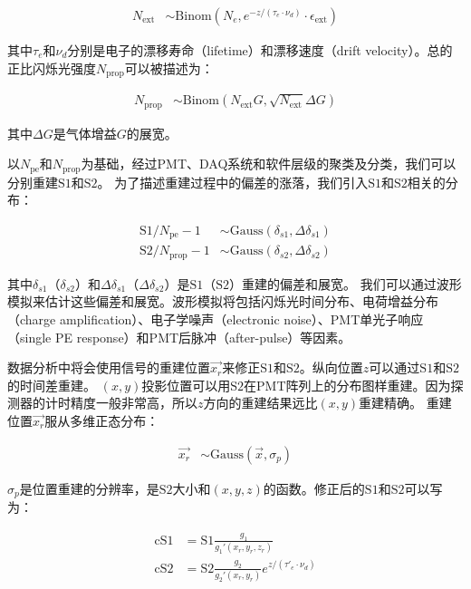 \begin{align}
    \label{eq:N_ext}
    N_{\mathrm{ext}} &\sim \mathrm{Binom}\left(N_e,e^{-z/(\tau_e\cdot\nu_d)}\cdot\epsilon_{\mathrm{ext}}\right)
\end{align}

其中$\tau_e$和$\nu_d$分别是电子的漂移寿命（lifetime）和漂移速度（drift velocity）。总的正比闪烁光强度$N_{\mathrm{prop}}$可以被描述为：

\begin{align}
    \label{eq:N_prop}
    N_{\mathrm{prop}} &\sim \mathrm{Binom}\left(N_{\mathrm{ext}}G,\sqrt{N_{\mathrm{ext}}}\Delta G\right)
\end{align}

其中$\Delta G$是气体增益$G$的展宽。

以$N_{\mathrm{pe}}$和$N_{\mathrm{prop}}$为基础，经过PMT、DAQ系统和软件层级的聚类及分类，我们可以分别重建$\mathrm{S1}$和$\mathrm{S2}$。
为了描述重建过程中的偏差的涨落，我们引入$\mathrm{S1}$和$\mathrm{S2}$相关的分布：

\begin{align}
    \label{eq:s1s2}
    \mathrm{S1}/N_{\mathrm{pe}}-1 &\sim \mathrm{Gauss}\left(\delta_{s1},\Delta \delta_{s1}\right) \\
    \mathrm{S2}/N_{\mathrm{prop}}-1 &\sim \mathrm{Gauss}\left(\delta_{s2},\Delta \delta_{s2}\right)
\end{align}

其中$\delta_{s1}$（$\delta_{s2}$）和$\Delta \delta_{s1}$（$\Delta \delta_{s2}$）是$\mathrm{S1}$（$\mathrm{S2}$）重建的偏差和展宽。
我们可以通过波形模拟来估计这些偏差和展宽。波形模拟将包括闪烁光时间分布、电荷增益分布（charge amplification）、电子学噪声（electronic noise）、PMT单光子响应（single PE response）和PMT后脉冲（after-pulse）等因素。

数据分析中将会使用信号的重建位置$\vec{x_r}$来修正$\mathrm{S1}$和$\mathrm{S2}$。纵向位置$z$可以通过$\mathrm{S1}$和$\mathrm{S2}$的时间差重建。
$(x,y)$投影位置可以用$\mathrm{S2}$在PMT阵列上的分布图样重建。因为探测器的计时精度一般非常高，所以$z$方向的重建结果远比$(x,y)$重建精确。
重建位置$\vec{x_r}$服从多维正态分布：

\begin{align}
    \label{eq:x_r}
    \vec{x_r} &\sim \mathrm{Gauss}\left(\vec{x},\sigma_p\right)
\end{align}

$\sigma_p$是位置重建的分辨率，是$\mathrm{S2}$大小和$(x,y,z)$的函数。修正后的$\mathrm{S1}$和$\mathrm{S2}$可以写为：

\begin{align}
    \label{eq:cs1_cs2}
    \mathrm{cS1} &= \mathrm{S1}\frac{g_1}{g_1'(x_r,y_r,z_r)} \\
    \mathrm{cS2} &= \mathrm{S2}\frac{g_2}{g_2'(x_r,y_r)}e^{z/(\tau'_e\cdot\nu_d)}
\end{align}

